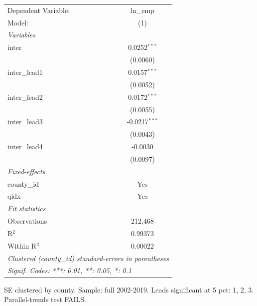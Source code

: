 
\begingroup
\centering
\begin{tabular}{lc}
   \tabularnewline \midrule \midrule
   Dependent Variable: & ln\_emp\\   
   Model:              & (1)\\  
   \midrule
   \emph{Variables}\\
   inter               & 0.0252$^{***}$\\   
                       & (0.0060)\\   
   inter\_lead1        & 0.0157$^{***}$\\   
                       & (0.0052)\\   
   inter\_lead2        & 0.0172$^{***}$\\   
                       & (0.0055)\\   
   inter\_lead3        & -0.0217$^{***}$\\   
                       & (0.0043)\\   
   inter\_lead4        & -0.0030\\   
                       & (0.0097)\\   
   \midrule
   \emph{Fixed-effects}\\
   county\_id          & Yes\\  
   qidx                & Yes\\  
   \midrule
   \emph{Fit statistics}\\
   Observations        & 212,468\\  
   R$^2$               & 0.99373\\  
   Within R$^2$        & 0.00022\\  
   \midrule \midrule
   \multicolumn{2}{l}{\emph{Clustered (county\_id) standard-errors in parentheses}}\\
   \multicolumn{2}{l}{\emph{Signif. Codes: ***: 0.01, **: 0.05, *: 0.1}}\\
\end{tabular}
 
\par \raggedright 
SE clustered by county. Sample: full 2002-2019. Leads significant at 5 pct: 1, 2, 3. Parallel-trends test FAILS.
\par\endgroup


